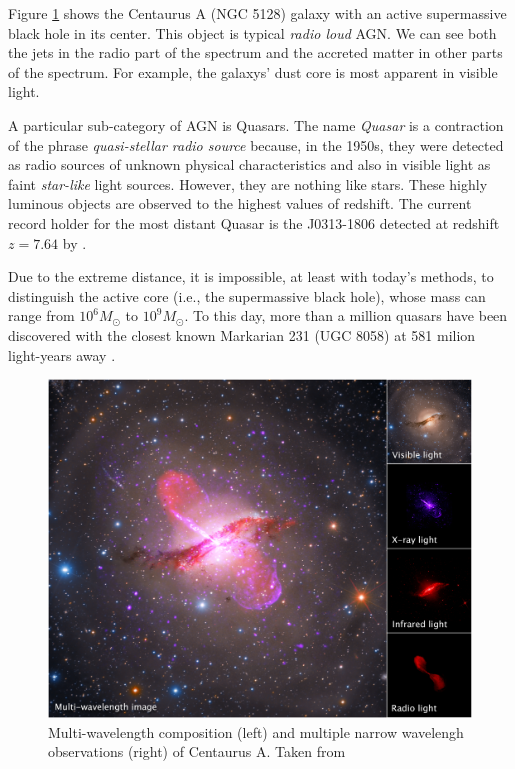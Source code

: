 Figure \ref{fig:centaurus_a_multiwave} shows the Centaurus A (NGC 5128) galaxy with an active supermassive black hole in its center. This object is typical \emph{radio loud} AGN. We can see both the jets in the radio part of the spectrum and the accreted matter in other parts of the spectrum. For example, the galaxys' dust core is most apparent in visible light.

A particular sub-category of AGN is Quasars. The name \emph{Quasar} is a contraction of the phrase \emph{quasi-stellar radio source} because, in the 1950s, they were detected as radio sources of unknown physical characteristics and also in visible light as faint \emph{star-like} light sources. However, they are nothing like stars. These highly luminous objects are observed to the highest values of redshift. The current record holder for the most distant Quasar is the J0313-1806 detected at redshift $z = 7.64$ by \cite{wang2021}. 

Due to the extreme distance, it is impossible, at least with today's methods, to distinguish the active core (i.e., the supermassive black hole), whose mass can range from $10^6 M_{\odot}$ to $10^{9} M_{\odot}$. To this day, more than a million quasars have been discovered with the closest known Markarian 231 (UGC 8058) at 581 milion light-years away \cite{gaia2018}. 

\begin{figure}
    \centering
    \includegraphics[width=\columnwidth]{img/multiwave_centaurus_a_agn.png}
    \caption{Multi-wavelength composition (left) and multiple narrow wavelengh observations (right) of Centaurus A. Taken from \cite{nasa_img_centaurus_a}}
    \label{fig:centaurus_a_multiwave}
\end{figure}


